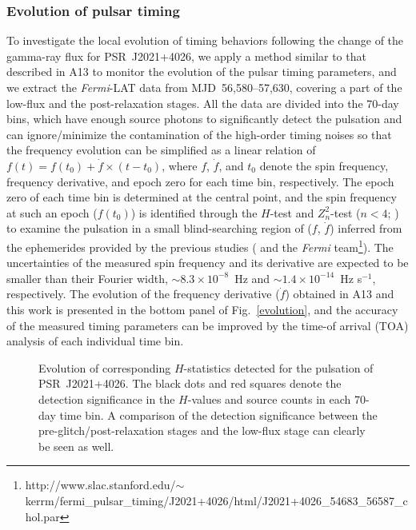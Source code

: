 \documentclass[12pt,preprint]{aastex}
\newcommand{\psr}{PSR~J2021+4026}
\begin{document}
\subsubsection{Evolution of pulsar timing}
\label{sssec:parameters}
To investigate the local evolution of timing behaviors following the change of the gamma-ray flux for \psr, we apply a method similar to that described in A13 to monitor the evolution of the pulsar timing parameters, and we extract the \emph{Fermi}-LAT data from MJD~56,580--57,630, covering a part of the low-flux and the post-relaxation stages.
All the data are divided into the 70-day bins, which have enough source photons to significantly detect the pulsation and can ignore/minimize the contamination of the high-order timing noises so that the frequency evolution can be simplified as a linear relation of $f(t) = f(t_0)+\dot{f}\times (t-t_0)$, where $f$, $\dot{f}$, and $t_0$ denote the spin frequency, frequency derivative, and epoch zero for  each time bin, respectively.
The epoch zero of each time bin is determined at the central point, and the spin frequency at such an epoch ($f(t_0)$) is identified through the $H$-test \citep{DB2010} and $Z_n^2$-test ($n< 4$; \citealt{Buc83}) to examine the pulsation in a small blind-searching region of ($f$, $\dot{f}$) inferred from the ephemerides provided by the previous studies
(\citealt{Ray2011,Lin&Hui} and the \emph{Fermi}\setcounter{footnote}{2}   team\footnote{http://www.slac.stanford.edu/$\sim$kerrm/fermi\_pulsar\_timing/J2021+4026/html/J2021+4026\_54683\_56587\_chol.par}).
 The uncertainties of the measured spin frequency and its derivative are expected to be smaller than their Fourier width, $\sim 8.3\times 10^{-8}$~Hz and $\sim 1.4\times 10^{-14}$~Hz s$^{-1}$, respectively.
The evolution of the frequency derivative ($\dot{f}$) obtained in A13 and this work is presented in the bottom panel of Fig.~\ref{evolution}, and the accuracy of the measured timing parameters can be improved by the time-of arrival (TOA) analysis \citep{Ray2011} of each individual time bin.

\begin{figure}[t]
  \centerline{}
  \caption[\textcolor{}Evolution of significance of the pulsed detection for \psr ]{Evolution of corresponding $H$-statistics detected for the  pulsation of \psr. The black dots and red squares denote the detection significance in the  $H$-values and source counts in each 70-day time bin. A comparison of the detection significance between the pre-glitch/post-relaxation stages and the low-flux stage can clearly be seen as well.}
  \label{Hs}
\end{figure}
\end{document}
